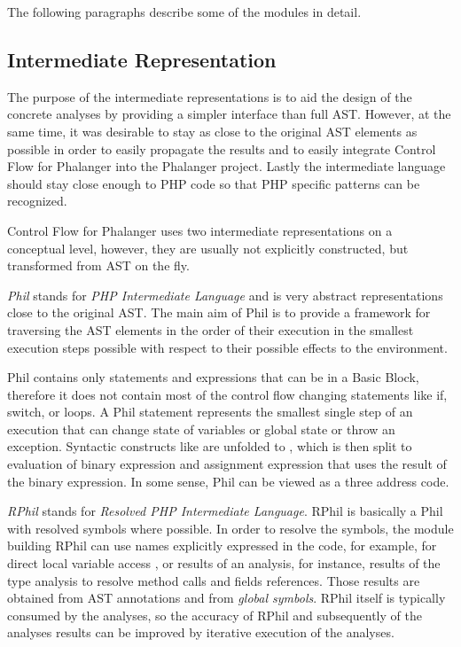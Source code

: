     The following paragraphs describe some of the 
    modules in detail.

    \subsection{Intermediate Representation}
    The purpose of the intermediate representations is 
    to aid the design of the concrete analyses by 
    providing a simpler interface than full AST.
    However, at the same time, it was desirable to stay as 
    close to the original AST elements as possible in order 
    to easily propagate the results and to easily integrate 
    Control Flow for Phalanger into the Phalanger project.         
    Lastly the intermediate language should stay close enough 
    to PHP code so that PHP specific patterns can be recognized.    
    
    Control Flow for Phalanger uses two intermediate representations 
    on a conceptual level, however, they are usually not explicitly 
    constructed, but transformed from AST on the fly.
    
    \emph{Phil} stands for \emph{PHP Intermediate Language} and is 
    very abstract representations close to the original AST. 
    The main aim of Phil is to provide a framework for 
    traversing the AST elements in the order of their 
    execution in the smallest execution steps possible 
    with respect to their possible effects to the environment.     
    
    Phil contains only statements and expressions that can be 
    in a Basic Block, therefore it does not contain most of the 
    control flow changing statements like if, switch, or loops. 
    A Phil statement represents the smallest single step 
    of an execution that can change state of variables 
    or global state or throw an exception. Syntactic 
    constructs like  are unfolded to 
    , which is then split to 
    evaluation of binary expression and assignment expression 
    that uses the result of the binary expression. In some sense, 
    Phil can be viewed as a three address code.
    
    \emph{RPhil} stands for \emph{Resolved PHP Intermediate Language}. 
    RPhil is basically a Phil with resolved symbols where possible. 
    In order to resolve the symbols, the module building RPhil 
    can use names explicitly expressed in the code, for example, 
    for direct local variable access , or results of 
    an analysis, for instance, results of the type analysis to 
    resolve method calls and fields references. Those results 
    are obtained from AST annotations and from \emph{global symbols}.
    RPhil itself is typically consumed by the analyses, 
    so the accuracy of RPhil and subsequently of the 
    analyses results can be improved by iterative execution 
    of the analyses.
    
